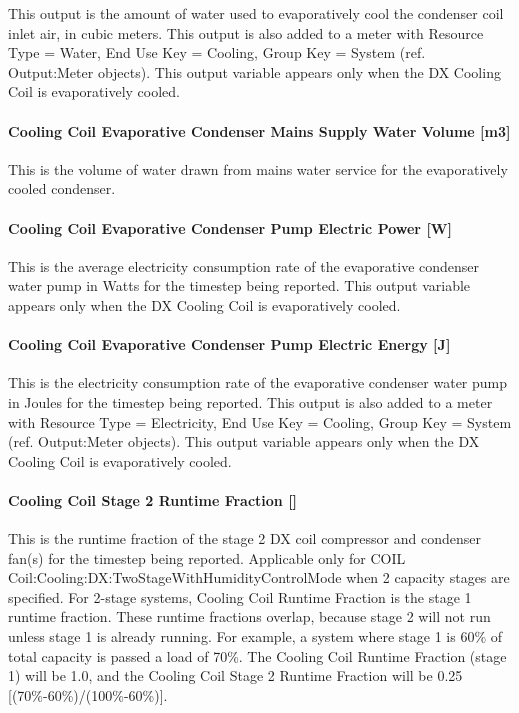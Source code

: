 This output is the amount of water used to evaporatively cool the condenser coil inlet air, in cubic meters. This output is also added to a meter with Resource Type = Water, End Use Key = Cooling, Group Key = System (ref. Output:Meter objects). This output variable appears only when the DX Cooling Coil is evaporatively cooled.

\paragraph{Cooling Coil Evaporative Condenser Mains Supply Water Volume {[}m3{]}}\label{cooling-coil-evaporative-condenser-mains-supply-water-volume-m3}

This is the volume of water drawn from mains water service for the evaporatively cooled condenser.

\paragraph{Cooling Coil Evaporative Condenser Pump Electric Power {[}W{]}}\label{cooling-coil-evaporative-condenser-pump-electric-power-w}

This is the average electricity consumption rate of the evaporative condenser water pump in Watts for the timestep being reported. This output variable appears only when the DX Cooling Coil is evaporatively cooled.

\paragraph{Cooling Coil Evaporative Condenser Pump Electric Energy {[}J{]}}\label{cooling-coil-evaporative-condenser-pump-electric-energy-j}

This is the electricity consumption rate of the evaporative condenser water pump in Joules for the timestep being reported. This output is also added to a meter with Resource Type = Electricity, End Use Key = Cooling, Group Key = System (ref. Output:Meter objects). This output variable appears only when the DX Cooling Coil is evaporatively cooled.

\paragraph{Cooling Coil Stage 2 Runtime Fraction {[]}}\label{cooling-coil-stage-2-runtime-fraction}

This is the runtime fraction of the stage 2 DX coil compressor and condenser fan(s) for the timestep being reported. Applicable only for COIL Coil:Cooling:DX:TwoStageWithHumidityControlMode when 2 capacity stages are specified. For 2-stage systems, Cooling Coil Runtime Fraction is the stage 1 runtime fraction. These runtime fractions overlap, because stage 2 will not run unless stage 1 is already running. For example, a system where stage 1 is 60\% of total capacity is passed a load of 70\%. The Cooling Coil Runtime Fraction (stage 1) will be 1.0, and the Cooling Coil Stage 2 Runtime Fraction will be 0.25 {[}(70\%-60\%)/(100\%-60\%){]}.

